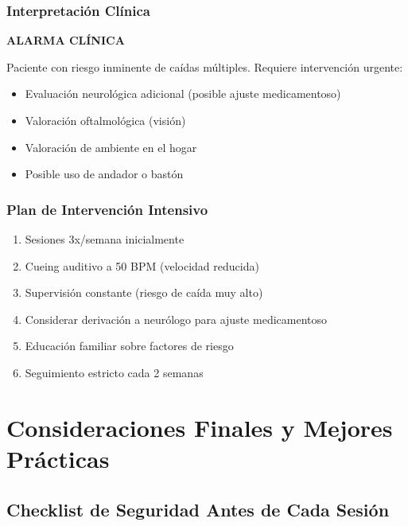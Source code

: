 \documentclass[12pt,a4paper,spanish,oneside]{book}
\begin{document}
\subsection{Interpretación Clínica}

\begin{advertenciabox}
  \textbf{ALARMA CLÍNICA}
  
  Paciente con riesgo inminente de caídas múltiples. Requiere intervención urgente:
  \begin{itemize}
    \item Evaluación neurológica adicional (posible ajuste medicamentoso)
    \item Valoración oftalmológica (visión)
    \item Valoración de ambiente en el hogar
    \item Posible uso de andador o bastón
  \end{itemize}
\end{advertenciabox}

\subsection{Plan de Intervención Intensivo}

\begin{enumerate}
  \item Sesiones 3x/semana inicialmente
  \item Cueing auditivo a 50 BPM (velocidad reducida)
  \item Supervisión constante (riesgo de caída muy alto)
  \item Considerar derivación a neurólogo para ajuste medicamentoso
  \item Educación familiar sobre factores de riesgo
  \item Seguimiento estricto cada 2 semanas
\end{enumerate}

\chapter{Consideraciones Finales y Mejores Prácticas}

\section{Checklist de Seguridad Antes de Cada Sesión}
\end{document}
